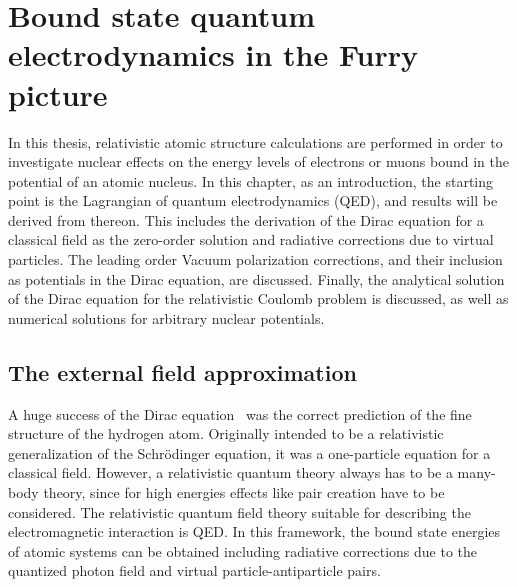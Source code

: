\chapter{Bound state quantum electrodynamics in the Furry picture}
\label{ch:furry_pic}
In this thesis, relativistic atomic structure calculations are performed in order to investigate nuclear effects on the energy levels of electrons or muons bound in the potential of an atomic nucleus. In this chapter, as an introduction, the starting point is the Lagrangian of quantum electrodynamics (QED), and results will be derived from thereon. This includes the derivation of the Dirac equation for a classical field as the zero-order solution and radiative corrections due to virtual particles. The leading order Vacuum polarization corrections, and their inclusion as potentials in the Dirac equation, are discussed. Finally, the analytical solution of the Dirac equation for the relativistic Coulomb problem is discussed, as well as numerical solutions for arbitrary nuclear potentials.
%
\section{The external field approximation}
\label{sec:ext_field}
A huge success of the Dirac equation~\cite{dirac1928} was the correct prediction of the fine structure of the hydrogen atom. Originally intended to be a relativistic generalization of the Schrödinger equation, it was a one-particle equation for a classical field. 
However, a relativistic quantum theory always has to be a many-body theory, since for high energies effects like pair creation have to be considered. The relativistic quantum field theory suitable for describing the electromagnetic interaction is QED. In this framework, the bound state energies of atomic systems can be obtained including radiative corrections due to the quantized photon field and virtual particle-antiparticle pairs. 

